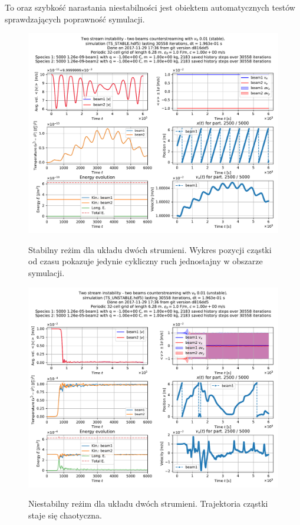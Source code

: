To oraz szybkość narastania niestabilności jest obiektem automatycznych testów sprawdzających poprawność symulacji.

\begin{figure}[h!]
  \includegraphics[width=\textwidth]{Images/TS_STABLE}
  \label{fig:twostream-stable}
  \caption{Stabilny reżim dla układu dwóch strumieni. Wykres pozycji cząstki od czasu pokazuje jedynie cykliczny ruch jednostajny w obszarze symulacji.}
\end{figure}

\begin{figure}[h!]
  \includegraphics[width=\textwidth]{Images/TS_UNSTABLE}
  \label{fig:twostream-unstable}
  \caption{Niestabilny reżim dla układu dwóch strumieni. Trajektoria cząstki staje się chaotyczna.}
\end{figure}
